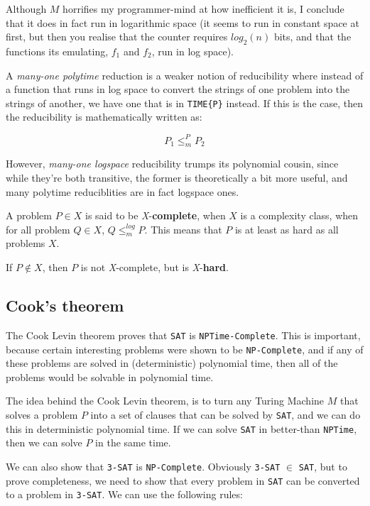 Although $M$ horrifies my programmer-mind at how inefficient it is, I conclude
that it does in fact run in logarithmic space (it seems to run in constant space
at first, but then you realise that the counter requires $log_2(n)$ bits, and
that the functions its emulating, $f_1$ and $f_2$, run in log space).

A \textit{many-one polytime} reduction is a weaker notion of reducibility where
instead of a function that runs in log space to convert the strings of one
problem into the strings of another, we have one that is in \texttt{TIME\{P\}}
instead. If this is the case, then the reducibility is mathematically written
as:

\[
  P_1 \leq_m^P P_2
\]


However, \textit{many-one logspace} reducibility trumps its polynomial cousin,
since while they're both transitive, the former is theoretically a bit more
useful, and many polytime reduciblities are in fact logspace ones.

A problem $P \in X$ is said to be \textit{X}-\textbf{complete}, when $X$ is a
complexity class, when for all problem $Q \in X$, $Q \leq_m^{log} P$. This means
that $P$ is at least as hard as all problems $X$.

If $P \notin X$, then $P$ is not \textit{X}-complete, but is
\textit{X}-\textbf{hard}.

\subsection{Cook's theorem}

The Cook Levin theorem proves that \texttt{SAT} is \texttt{NPTime-Complete}.
This is important, because certain interesting problems were shown to be
\texttt{NP-Complete}, and if any of these problems are solved in
(deterministic) polynomial time, then all of the problems would be solvable in
polynomial time.

The idea behind the Cook Levin theorem, is to turn any Turing Machine $M$ that
solves a problem $P$ into a set of clauses that can be solved by \texttt{SAT},
and we can do this in deterministic polynomial time. If we can solve
\texttt{SAT} in better-than \texttt{NPTime}, then we can solve $P$ in the same
time.

We can also show that \texttt{3-SAT} is \texttt{NP-Complete}. Obviously
\texttt{3-SAT} $\in$ \texttt{SAT}, but to prove completeness, we need to show
that every problem in \texttt{SAT} can be converted to a problem in
\texttt{3-SAT}. We can use the following rules:

